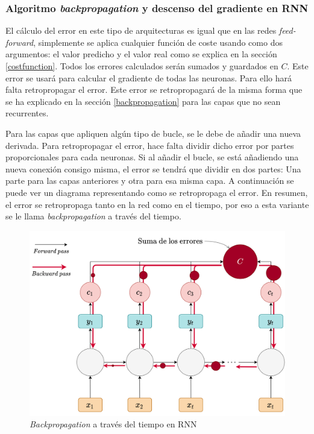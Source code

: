 \subsubsection{Algoritmo \textit{backpropagation} y descenso del gradiente en RNN}
El cálculo del error en este tipo de arquitecturas es igual que en las redes \textit{feed-forward}, simplemente se aplica cualquier función de coste usando como dos argumentos: el valor predicho y el valor real como se explica en la sección \ref{costfunction}. Todos los errores calculados serán sumados y guardados en $C$. Este error se usará para calcular el gradiente de todas las neuronas. Para ello hará falta retropropagar el error. Este error se retropropagará de la misma forma que se ha explicado en la sección \ref{backpropagation} para las capas que no sean recurrentes.
\newline

Para las capas que apliquen algún tipo de bucle, se le debe de añadir una nueva derivada. Para retropropagar el error, hace falta dividir dicho error por partes proporcionales para cada neuronas. Si al añadir el bucle, se está añadiendo una nueva conexión consigo misma, el error se tendrá que dividir en dos partes: Una parte para las capas anteriores y otra para esa misma capa. A continuación se puede ver un diagrama representando como se retropropaga el error. En resumen, el error se retropropaga tanto en la red como en el tiempo, por eso a esta variante se le llama \textit{backpropagation} a través del tiempo.


\begin{figure}[H]
    \centering
    \includegraphics[width=14cm]{images/state-of-art/rnn/rnn-backward.png}
    \caption{\textit{Backpropagation} a través del tiempo en RNN}
    \label{fig:Backpropagation_through_time}
\end{figure}

